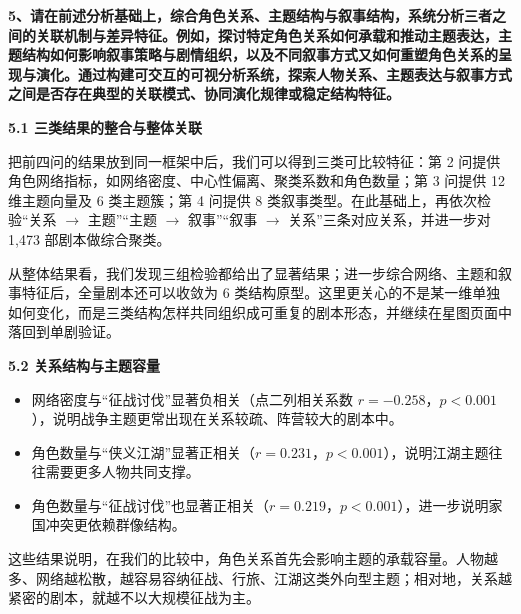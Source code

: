 \documentclass[12pt, a4paper]{article}
\begin{document}
{\fontsize{13bp}{20bp}\heiti\bfseries
5、请在前述分析基础上，综合角色关系、主题结构与叙事结构，系统分析三者之间的关联机制与差异特征。例如，探讨特定角色关系如何承载和推动主题表达，主题结构如何影响叙事策略与剧情组织，以及不同叙事方式又如何重塑角色关系的呈现与演化。通过构建可交互的可视分析系统，探索人物关系、主题表达与叙事方式之间是否存在典型的关联模式、协同演化规律或稳定结构特征。
}

\vspace{6pt}

{\fontsize{13bp}{18bp}\heiti\bfseries 5.1 三类结果的整合与整体关联}

\vspace{4pt}

{\fontsize{12bp}{20bp}\kaishu
把前四问的结果放到同一框架中后，我们可以得到三类可比较特征：第 2 问提供角色网络指标，如网络密度、中心性偏离、聚类系数和角色数量；第 3 问提供 12 维主题向量及 6 类主题簇；第 4 问提供 8 类叙事类型。在此基础上，再依次检验“关系 $\rightarrow$ 主题”“主题 $\rightarrow$ 叙事”“叙事 $\rightarrow$ 关系”三条对应关系，并进一步对 1{,}473 部剧本做综合聚类。
}

{\fontsize{12bp}{20bp}\kaishu
从整体结果看，我们发现三组检验都给出了显著结果；进一步综合网络、主题和叙事特征后，全量剧本还可以收敛为 6 类结构原型。这里更关心的不是某一维单独如何变化，而是三类结构怎样共同组织成可重复的剧本形态，并继续在星图页面中落回到单剧验证。
}

\vspace{6pt}

{\fontsize{13bp}{18bp}\heiti\bfseries 5.2 关系结构与主题容量}

\vspace{4pt}
{\fontsize{12bp}{20bp}\kaishu
\begin{itemize}[leftmargin=2.2em,itemsep=2pt,topsep=2pt]
\item 网络密度与“征战讨伐”显著负相关（点二列相关系数 $r=-0.258$，$p<0.001$），说明战争主题更常出现在关系较疏、阵营较大的剧本中。
\item 角色数量与“侠义江湖”显著正相关（$r=0.231$，$p<0.001$），说明江湖主题往往需要更多人物共同支撑。
\item 角色数量与“征战讨伐”也显著正相关（$r=0.219$，$p<0.001$），进一步说明家国冲突更依赖群像结构。
\end{itemize}
}

{\fontsize{12bp}{20bp}\kaishu
这些结果说明，在我们的比较中，角色关系首先会影响主题的承载容量。人物越多、网络越松散，越容易容纳征战、行旅、江湖这类外向型主题；相对地，关系越紧密的剧本，就越不以大规模征战为主。
}
\end{document}

